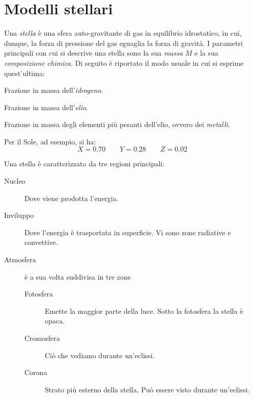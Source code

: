 \section{Modelli stellari}\label{sec:modelli-stellari}
Una \emph{stella} è una sfera auto-gravitante di gas in equilibrio idrostatico, in cui, dunque, la forza di pressione del gas eguaglia la forza di gravità. I parametri principali con cui si descrive una stella sono la sua \emph{massa} $M$ e la sua \emph{composizione chimica}. Di seguito è riportato il modo usuale in cui si esprime quest'ultima:
\begin{description}\label{tab:composizione-chimica}
    \item[X] Frazione in massa dell'\emph{idrogeno}.
    \item[Y] Frazione in massa dell'\emph{elio}.
    \item[Z] Frazione in massa degli elementi più pesanti dell'elio, ovvero dei \emph{metalli}.
\end{description}
Per il Sole, ad esempio, si ha:
\[
    X=0.70 \qquad Y=0.28 \qquad Z=0.02
\]

Una stella è caratterizzata da tre regioni principali:
\begin{description}
    \item[Nucleo] Dove viene prodotta l'energia.
    \item[Inviluppo] Dove l'energia è trasportata in superficie. Vi sono zone radiative e convettive.
    \item[Atmosfera] è a sua volta suddivisa in tre zone
    \begin{description}
        \item[Fotosfera] Emette la maggior parte della luce. Sotto la fotosfera la stella è opaca.
        \item[Cromosfera] Ciò che vediamo durante un'eclissi.
        \item[Corona] Strato più esterno della stella. Può essere visto durante un'eclissi.
    \end{description}
\end{description}

